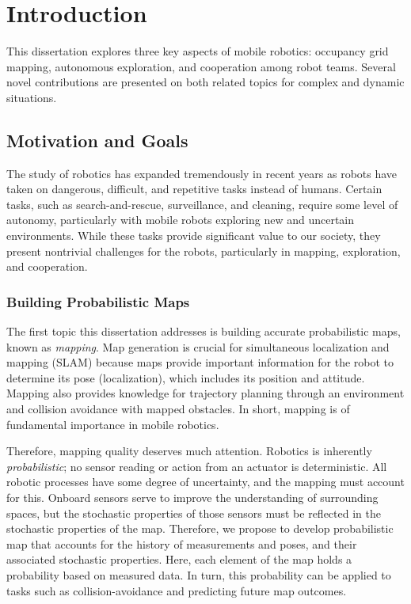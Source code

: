 \documentclass[thesis]{thesis-gwu}
\begin{document}
%


\chapter{Introduction} \label{chap:intro}

This dissertation explores three key aspects of mobile robotics: occupancy grid mapping, autonomous exploration, and cooperation among robot teams. Several novel contributions are presented on both related topics for complex and dynamic situations.


\section{Motivation and Goals}

The study of robotics has expanded tremendously in recent years as robots have taken on dangerous, difficult, and repetitive tasks instead of humans. Certain tasks, such as search-and-rescue, surveillance, and cleaning, require some level of autonomy, particularly with mobile robots exploring new and uncertain environments. While these tasks provide significant value to our society, they present nontrivial challenges for the robots, particularly in mapping, exploration, and cooperation.


\subsection{Building Probabilistic Maps}

The first topic this dissertation addresses is building accurate probabilistic maps, known as \emph{mapping}. Map generation is crucial for simultaneous localization and mapping (SLAM) because maps provide important information for the robot to determine its pose (localization), which includes its position and attitude. Mapping also provides knowledge for trajectory planning through an environment and collision avoidance with mapped obstacles. In short, mapping is of fundamental importance in mobile robotics.

Therefore, mapping quality deserves much attention. Robotics is inherently \emph{probabilistic}; no sensor reading or action from an actuator is deterministic. All robotic processes have some degree of uncertainty, and the mapping must account for this. Onboard sensors serve to improve the understanding of surrounding spaces, but the stochastic properties of those sensors must be reflected in the stochastic properties of the map. Therefore, we propose to develop probabilistic map that accounts for the history of measurements and poses, and their associated stochastic properties. Here, each element of the map holds a probability based on measured data. In turn, this probability can be applied to tasks such as collision-avoidance and predicting future map outcomes.
\end{document}
